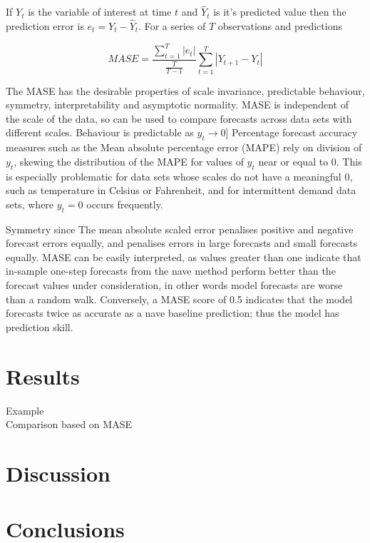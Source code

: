 \documentclass[a4paper]{article}
\begin{document}
If $Y_t$ is the variable of interest at time $t$ and ${\hat{Y}_t}$ is it's predicted value then the prediction error is $e_t = Y_t - \hat{Y}_t$. For a series of $T$ observations and predictions

\begin{equation} {MASE={\frac{\sum _{t=1}^{T}\left|e_{t}\right|}{\frac {T}{T-1}}\sum _{t=1}^{T}\left|Y_{t+1}-Y_{t}\right|}} \end{equation}

The MASE has the desirable properties of scale invariance, predictable behaviour, symmetry, interpretability and asymptotic normality. MASE is independent of the scale of the data, so can be used to compare forecasts across data sets with different scales. Behaviour is predictable as $y_{t}\rightarrow 0$] Percentage forecast accuracy measures such as the Mean absolute percentage error (MAPE) rely on division of $y_{t}$, skewing the distribution of the MAPE for values of $y_{t}$ near or equal to 0. This is especially problematic for data sets whose scales do not have a meaningful 0, such as temperature in Celsius or Fahrenheit, and for intermittent demand data sets, where $y_{t}=0$  occurs frequently.

Symmetry since The mean absolute scaled error penalises positive and negative forecast errors equally, and penalises errors in large forecasts and small forecasts equally. MASE can be easily interpreted, as values greater than one indicate that in-sample one-step forecasts from the nave method perform better than the forecast values under consideration, in other words model forecasts are worse than a random walk. Conversely, a MASE score of 0.5 indicates that the model forecasts twice as accurate as a nave baseline prediction; thus the model has prediction skill.  

\section{Results}

\begin{description}
\item[Example]
\item[Comparison based on MASE]
\end{description}

\section{Discussion}

\section{Conclusions}



\end{document}
